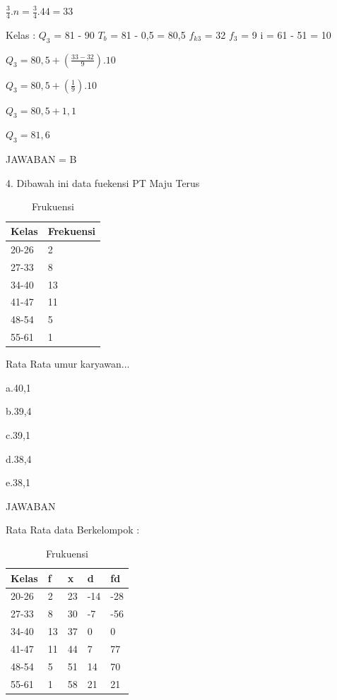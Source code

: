 \documentclass[11pt,fleqn]{book} %
\begin{document}
{$\frac{3}{4}.n = \frac{3}{4}.44 = 33$

Kelas :
$Q_{3}$ = 81 - 90
$T_{b}$ = 81 - 0,5 = 80,5
$f_{k3}$ = 32
$f_{3}$ = 9
i = 61 - 51 = 10

$ Q_{3} = 80,5 + (\frac{33-32}{9}).10$

$ Q_{3} = 80,5 + (\frac{1}{9}).10$

$Q_{3} = 80,5 + 1,1 $

$Q_{3} = 81,6$

JAWABAN = B

4. Dibawah ini data fuekensi PT Maju Terus

\begin{table}[h]
\centering
\begin{tabular}{l l}
\toprule
\textbf{Kelas} & \textbf{Frekuensi}\\
\midrule
20-26 & 2  \\
27-33 & 8 \\
34-40 & 13\\
41-47 & 11 \\
48-54 & 5 \\
55-61 & 1 \\
\bottomrule
\end{tabular}
\caption{Frukuensi}
\end{table}

Rata Rata umur karyawan...

a.40,1

b.39,4

c.39,1

d.38,4

e.38,1

JAWABAN 


Rata Rata data Berkelompok :


\begin{table}[h]
\centering
\begin{tabular}{l l l l l}
\toprule
\textbf{Kelas} & \textbf{f} & \textbf{x} & \textbf{d} & \textbf{fd}\\
\midrule
20-26 & 2 & 23 & -14 & -28\\
27-33 & 8 & 30 & -7 & -56\\
34-40 & 13 & 37 & 0 & 0\\
41-47 & 11 & 44 & 7 & 77\\
48-54 & 5 & 51 & 14 & 70\\
55-61 & 1 & 58 & 21 & 21\\
\bottomrule
\end{tabular}
\caption{Frukuensi}
\end{table}






}
\end{document}
